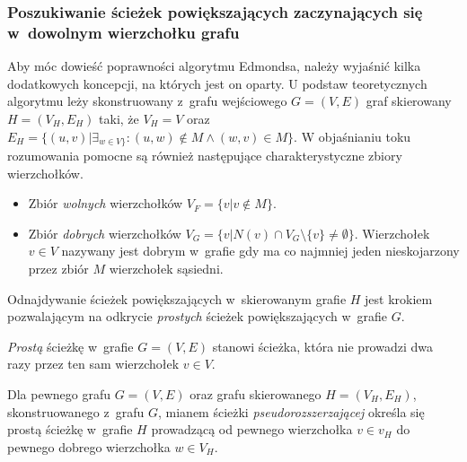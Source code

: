 \subsubsection{\textbf{Poszukiwanie ścieżek powiększających zaczynających się w~dowolnym wierzchołku grafu}}
\par{
  Aby móc dowieść poprawności algorytmu Edmondsa, należy wyjaśnić kilka dodatkowych koncepcji, na których jest on oparty.
  U podstaw teoretycznych algorytmu leży skonstruowany z~grafu wejściowego $G=(V, E)$ graf skierowany $H=(V_H, E_H)$ taki, że $V_H=V$ oraz $E_H=\{(u, v)|\exists_{w\in V\}}:(u, w) \notin M \land (w, v) \in M\}$.
  W objaśnianiu toku rozumowania pomocne są również następujące charakterystyczne zbiory wierzchołków.
  \begin{itemize}
    \item Zbiór \emph{wolnych} wierzchołków $V_F=\{v | v \notin M\}$.
    \item Zbiór \emph{dobrych} wierzchołków $V_G=\{v | N(v) \cap V_G \setminus \{v\} \neq \emptyset\}$. Wierzchołek $v\in V$ nazywany jest dobrym w~grafie gdy ma co najmniej jeden nieskojarzony przez zbiór $M$ wierzchołek sąsiedni.
  \end{itemize}
  
  Odnajdywanie ścieżek powiększających w~skierowanym grafie $H$ jest krokiem pozwalającym na odkrycie \emph{prostych} ścieżek powiększających w~grafie $G$.
  \begin{definition}
    \emph{Prostą} ścieżkę w~grafie $G=(V, E)$ stanowi ścieżka, która nie prowadzi dwa razy przez ten sam wierzchołek $v \in V$.
  \end{definition}
  \begin{definition}
    Dla pewnego grafu $G=(V, E)$ oraz grafu skierowanego $H=(V_H,E_H)$, skonstruowanego z~grafu $G$, mianem ścieżki \emph{pseudorozszerzającej} określa się prostą ścieżkę w~grafie $H$ prowadzącą od pewnego wierzchołka $v \in v_H$ do pewnego dobrego wierzchołka $w \in V_H$.
  \end{definition}

}
